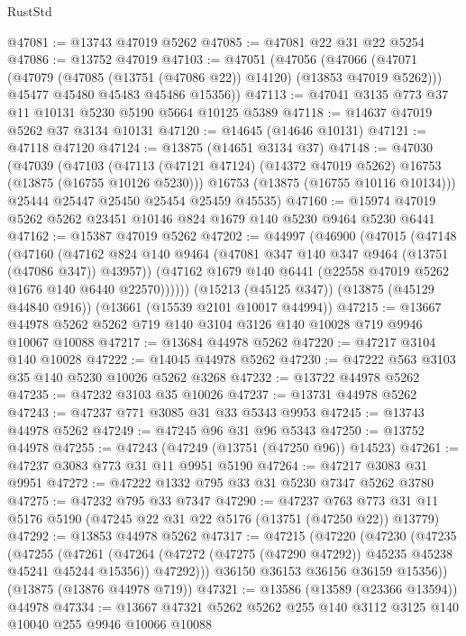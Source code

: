 \begin{lexlean}{RustStd}
\begin{coremodule}
@47081 := @13743 @47019 @5262
@47085 := @47081 @22 @31 @22 @5254
@47086 := @13752 @47019
@47103 := @47051
    (@47056
      (@47066
        (@47071 (@47079 (@47085 (@13751 (@47086 @22)) @14120) (@13853 @47019 @5262)))
        @45477
        @45480
        @45483
        @45486
        @15356))
@47113 := @47041 @3135 @773 @37 @11 @10131 @5230 @5190 @5664 @10125 @5389
@47118 := @14637 @47019 @5262 @37 @3134 @10131
@47120 := @14645 (@14646 @10131)
@47121 := @47118 @47120
@47124 := @13875 (@14651 @3134 @37)
@47148 := @47030
    (@47039
      (@47103
        (@47113 (@47121 @47124) (@14372 @47019 @5262) @16753 (@13875 (@16755 @10126 @5230)))
        @16753
        (@13875 (@16755 @10116 @10134)))
      @25444
      @25447
      @25450
      @25454
      @25459
      @45535)
@47160 := @15974 @47019 @5262 @5262 @23451 @10146 @824 @1679 @140 @5230 @9464 @5230 @6441
@47162 := @15387 @47019 @5262
@47202 := @44997
    (@46900
      (@47015
        (@47148
          (@47160
            (@47162 @824 @140 @9464 (@47081 @347 @140 @347 @9464 (@13751 (@47086 @347)) @43957))
            (@47162 @1679 @140 @6441 (@22558 @47019 @5262 @1676 @140 @6440 @22570))))))
    (@15213 (@45125 @347))
    (@13875 (@45129 @44840 @916))
    (@13661 (@15539 @2101 @10017 @44994))
@47215 := @13667 @44978 @5262 @5262 @719 @140 @3104 @3126 @140 @10028 @719 @9946 @10067 @10088
@47217 := @13684 @44978 @5262
@47220 := @47217 @3104 @140 @10028
@47222 := @14045 @44978 @5262
@47230 := @47222 @563 @3103 @35 @140 @5230 @10026 @5262 @3268
@47232 := @13722 @44978 @5262
@47235 := @47232 @3103 @35 @10026
@47237 := @13731 @44978 @5262
@47243 := @47237 @771 @3085 @31 @33 @5343 @9953
@47245 := @13743 @44978 @5262
@47249 := @47245 @96 @31 @96 @5343
@47250 := @13752 @44978
@47255 := @47243 (@47249 (@13751 (@47250 @96)) @14523)
@47261 := @47237 @3083 @773 @31 @11 @9951 @5190
@47264 := @47217 @3083 @31 @9951
@47272 := @47222 @1332 @795 @33 @31 @5230 @7347 @5262 @3780
@47275 := @47232 @795 @33 @7347
@47290 := @47237
    @763
    @773
    @31
    @11
    @5176
    @5190
    (@47245 @22 @31 @22 @5176 (@13751 (@47250 @22)) @13779)
@47292 := @13853 @44978 @5262
@47317 := @47215
    (@47220
      (@47230
        (@47235
          (@47255
            (@47261
              (@47264 (@47272 (@47275 (@47290 @47292)) @45235 @45238 @45241 @45244 @15356))
              @47292)))
        @36150
        @36153
        @36156
        @36159
        @15356))
    (@13875 (@13876 @44978 @719))
@47321 := @13586 (@13589 (@23366 @13594)) @44978
@47334 := @13667 @47321 @5262 @5262 @255 @140 @3112 @3125 @140 @10040 @255 @9946 @10066 @10088

\end{coremodule}
\end{lexlean}

